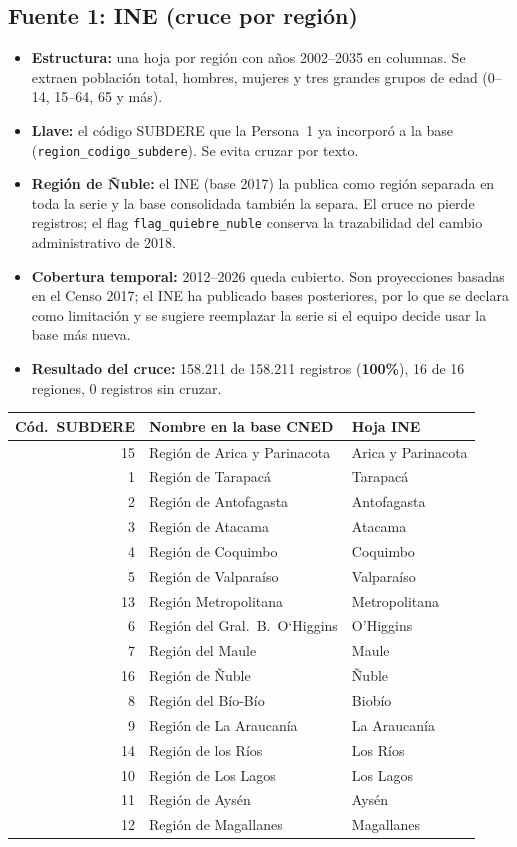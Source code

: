 \documentclass[11pt,a4paper]{article}
\begin{document}
\subsection{Fuente 1: INE (cruce por regi\'on)}
\begin{itemize}
    \item \textbf{Estructura:} una hoja por regi\'on con a\~nos 2002--2035 en columnas. Se extraen poblaci\'on total, hombres, mujeres y tres grandes grupos de edad (0--14, 15--64, 65 y m\'as).
    \item \textbf{Llave:} el c\'odigo SUBDERE que la Persona~1 ya incorpor\'o a la base (\texttt{region\_codigo\_subdere}). Se evita cruzar por texto.
    \item \textbf{Regi\'on de \~Nuble:} el INE (base 2017) la publica como regi\'on separada en toda la serie y la base consolidada tambi\'en la separa. El cruce no pierde registros; el flag \texttt{flag\_quiebre\_nuble} conserva la trazabilidad del cambio administrativo de 2018.
    \item \textbf{Cobertura temporal:} 2012--2026 queda cubierto. Son proyecciones basadas en el Censo 2017; el INE ha publicado bases posteriores, por lo que se declara como limitaci\'on y se sugiere reemplazar la serie si el equipo decide usar la base m\'as nueva.
    \item \textbf{Resultado del cruce:} 158.211 de 158.211 registros (\textbf{100\%}), 16 de 16 regiones, 0 registros sin cruzar.
\end{itemize}

\begin{center}
\small
\begin{tabular}{@{}rll@{}}
\toprule
\textbf{C\'od.\ SUBDERE} & \textbf{Nombre en la base CNED} & \textbf{Hoja INE} \\
\midrule
15 & Regi\'on de Arica y Parinacota & Arica y Parinacota \\
1 & Regi\'on de Tarapac\'a & Tarapac\'a \\
2 & Regi\'on de Antofagasta & Antofagasta \\
3 & Regi\'on de Atacama & Atacama \\
4 & Regi\'on de Coquimbo & Coquimbo \\
5 & Regi\'on de Valpara\'iso & Valpara\'iso \\
13 & Regi\'on Metropolitana & Metropolitana \\
6 & Regi\'on del Gral.\ B.\ O`Higgins & O'Higgins \\
7 & Regi\'on del Maule & Maule \\
16 & Regi\'on de \~Nuble & \~Nuble \\
8 & Regi\'on del B\'io-B\'io & Biob\'io \\
9 & Regi\'on de La Araucan\'ia & La Araucan\'ia \\
14 & Regi\'on de los R\'ios & Los R\'ios \\
10 & Regi\'on de Los Lagos & Los Lagos \\
11 & Regi\'on de Ays\'en & Ays\'en \\
12 & Regi\'on de Magallanes & Magallanes \\
\bottomrule
\end{tabular}
\end{center}
\end{document}
